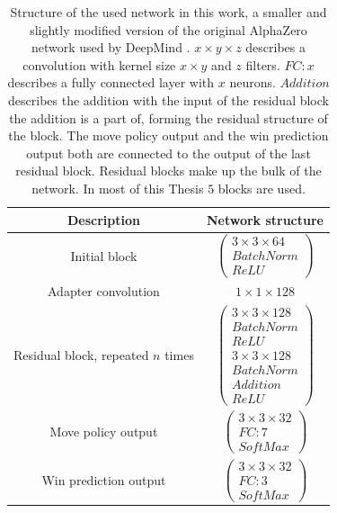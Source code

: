\documentclass[12pt,onecolumn,oneside,titlepage]{article}
\begin{document}
\begin{table} [H]
 \centering
  \begin{tabular}{c | c }
   Description & Network structure \\
   \hline
   \hline
   Initial block & $\begin{pmatrix} 3 \times 3 \times 64 \\ BatchNorm \\ ReLU \end{pmatrix}$ \\
   \hline
   Adapter convolution & $1 \times 1 \times 128$ \\
   \hline
   Residual block, repeated $n$ times & $\begin{pmatrix} 3 \times 3 \times 128 \\ BatchNorm \\ ReLU \\ 3 \times 3 \times 128 \\ BatchNorm \\ Addition \\ ReLU \end{pmatrix}$ \\
   \hline 
   Move policy output & $\begin{pmatrix} 3 \times 3 \times 32 \\ FC: 7 \\ SoftMax \end{pmatrix}$ \\
   \hline
   Win prediction output & $\begin{pmatrix} 3 \times 3 \times 32 \\ FC: 3 \\ SoftMax \end{pmatrix}$
  \end{tabular}
  \caption{Structure of the used network in this work, a smaller and slightly modified version of the original AlphaZero network used by DeepMind \cite{silver2018general}.
  $x \times y \times z$ describes a convolution with kernel size $x \times y$ and $z$ filters. $FC: x$ describes a fully connected layer with $x$ neurons. $Addition$ describes the addition with the input of the residual block the addition is a part of, forming the residual structure of the block.
  The move policy output and the win prediction output both are connected 
  to the output of the last residual block. Residual blocks make up the bulk of the network. In most of this Thesis $5$ blocks are used.}
  \label{fig:blocks_network}
\end{table}
\end{document}
